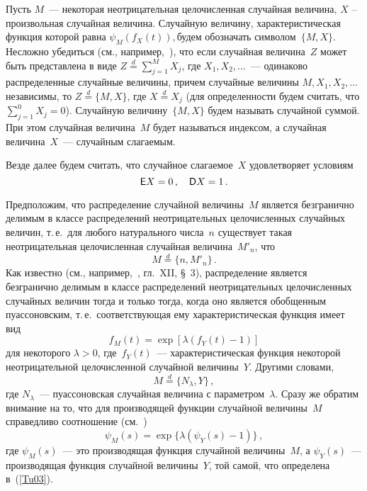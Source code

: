 \begin{multicols}{2}
Пусть $M$~--- некоторая неотрицательная целочисленная случайная
величина, $X$ -- произвольная случайная величина. Случайную
величину, характеристическая функция которой равна
$\psi_M(f_X(t)),$\linebreak будем обозначать символом~$\{M,X\}$. Не\-слож\-но
убедиться (см., например,~\cite{1g}), что если %
случайная величина~$Z$ 
может быть представлена в \mbox{виде} $Z \stackrel{d}{=} \sum\limits_{j=1}^M
X_j$, где $X_1, X_2, \ldots$~--- одинаково распределенные случайные
величины, причем случайные величины $M, X_1, X_2, \ldots $ независимы, то
$Z\stackrel{d}{=}\{M,X\}$, где $X \stackrel{d}{=} X_j$ (для
определенности будем считать, что $\sum\limits_{j=1}^0 X_j = 0$).
Случайную величину~$\{M,X\}$ будем называть случайной суммой. При
этом случайная величина~$M$ будет называться индексом, а случайная
величина~$X$~--- случайным слагаемым.

Везде далее будем считать, что случайное слагаемое~$X$
удовлетворяет условиям
\begin{equation}
 {\sf E} X =0\,, \quad {\sf D} X =1\,.
 \label{Tu02}
\end{equation}

Предположим, что распределение случайной величины~$M$ является
безгранично делимым в классе распределений неотрицательных
целочисленных случайных величин, т.\,е.\ для любого натурального
числа~$n$ существует такая неотрицательная целочисленная случайная
величина~$M'_n$, что
$$
M \stackrel{d}{=} \{n,M'_n\}\,.
$$
Как известно (см., например,~\cite{3g}, гл.~XII, \S~3),
распределение является безгранично делимым в классе распределений
неотрицательных целочисленных случайных величин тогда и только
тогда, когда оно является обобщенным пуассоновским, т.\,е.\
соответствующая ему характеристическая функция имеет вид
$$
f_M(t) = \exp[\lambda(f_Y(t)-1)]
$$
для некоторого $\lambda>0$, где~$f_Y(t)$~--- характеристическая
функция некоторой неотрицательной це\-ло\-чис\-ленной случайной величины~$Y$. Другими сло\-вами,
\begin{equation}
 M \stackrel{d}{=} \{N_{\lambda},Y\}\,,
 \label{Tu03}
\end{equation}
где $N_{\lambda}$~--- пуассоновская случайная величина с параметром~$\lambda$. 
Сразу же обратим внимание на то, что для производящей
функции случайной величины~$M$ справедливо соотношение (см.~\cite{3g})
\begin{equation}
 \psi_M(s) = \exp \{\lambda(\psi_Y(s)-1)\}\,,
 \label{Tu04}
\end{equation}
где $\psi_M(s)$~--- это производящая функция случайной величины~$M$, 
а $\psi_Y(s)$~--- производящая функция случайной величины~$Y$,
той самой, что определена в~(\ref{Tu03}).


\end{multicols}
